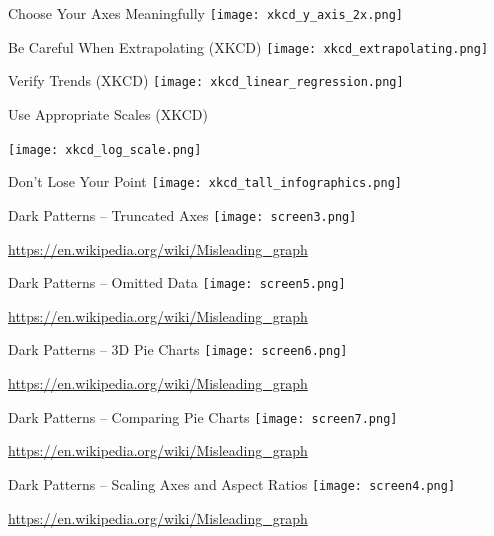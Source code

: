 \documentclass[ignorenonframetext,xcolor=x11names]{beamer}
\begin{document}
\begin{frame}{Choose Your Axes Meaningfully}
\centering
  \texttt{[image: xkcd\_y\_axis\_2x.png]}
\end{frame}

\begin{frame}{Be Careful When Extrapolating (XKCD)}
\centering
  \texttt{[image: xkcd\_extrapolating.png]}
\end{frame}

\begin{frame}{Verify Trends (XKCD)}
\centering
  \texttt{[image: xkcd\_linear\_regression.png]}
\end{frame}

\begin{frame}{Use Appropriate Scales (XKCD)}
\centering

  \texttt{[image: xkcd\_log\_scale.png]}
\end{frame}

\begin{frame}{Don't Lose Your Point}
\centering
  \texttt{[image: xkcd\_tall\_infographics.png]}
\end{frame}

\begin{frame}{Dark Patterns -- Truncated Axes}
\centering
\texttt{[image: screen3.png]}

\scriptsize\url{https://en.wikipedia.org/wiki/Misleading_graph}
\end{frame}

\begin{frame}{Dark Patterns -- Omitted Data}
\centering
\texttt{[image: screen5.png]}

\scriptsize\url{https://en.wikipedia.org/wiki/Misleading_graph}
\end{frame}

\begin{frame}{Dark Patterns -- 3D Pie Charts}
\centering
\texttt{[image: screen6.png]}

\scriptsize\url{https://en.wikipedia.org/wiki/Misleading_graph}
\end{frame}

\begin{frame}{Dark Patterns -- Comparing Pie Charts}
\centering
\texttt{[image: screen7.png]}

\scriptsize\url{https://en.wikipedia.org/wiki/Misleading_graph}
\end{frame}

\begin{frame}{Dark Patterns -- Scaling Axes and Aspect Ratios}
\centering
\texttt{[image: screen4.png]}

\scriptsize\url{https://en.wikipedia.org/wiki/Misleading_graph}
\end{frame}
\end{document}
